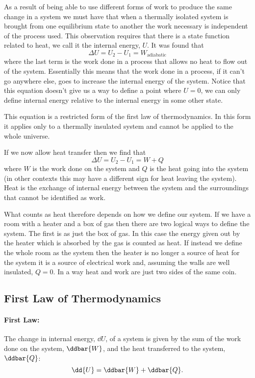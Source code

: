     As a result of being able to use different forms of work to produce the same change in a system we must have that when a thermally isolated system is brought from one equilibrium state to another the work necessary is independent of the process used.
    This observation requires that there is a state function related to heat, we call it the internal energy, \(U\).
    It was found that
    \[\Delta U = U_2 - U_1 = W_\text{adiabatic}\]
    where the last term is the work done in a process that allows no heat to flow out of the system.
    Essentially this means that the work done in a process, if it can't go anywhere else, goes to increase the internal energy of the system.
    Notice that this equation doesn't give us a way to define a point where \(U = 0\), we can only define internal energy relative to the internal energy in some other state.
    
    This equation is a restricted form of the first law of thermodynamics.
    In this form it applies only to a thermally insulated system and cannot be applied to the whole universe.
    
    If we now allow heat transfer then we find that
    \[\Delta U = U_2 - U_1 = W + Q\]
    where \(W\) is the work done on the system and \(Q\) is the heat going into the system (in other contexts this may have a different sign for heat leaving the system).
    Heat is the exchange of internal energy between the system and the surroundings that cannot be identified as work.
    
    What counts as heat therefore depends on how we define our system.
    If we have a room with a heater and a box of gas then there are two logical ways to define the system.
    The first is as just the box of gas.
    In this case the energy given out by the heater which is absorbed by the gas is counted as heat.
    If instead we define the whole room as the system then the heater is no longer a source of heat for the system it is a source of electrical work and, assuming the walls are well insulated, \(Q = 0\).
    In a way heat and work are just two sides of the same coin.
    
    \subsection{First Law of Thermodynamics}
    \paragraph{First Law:} The change in internal energy, \(\dd{U}\), of a system is given by the sum of the work done on the system, \(\ddbar{W}\), and the heat transferred to the system, \(\ddbar{Q}\):
    \[\dd{U} = \ddbar{W} + \ddbar{Q}.\]
    
